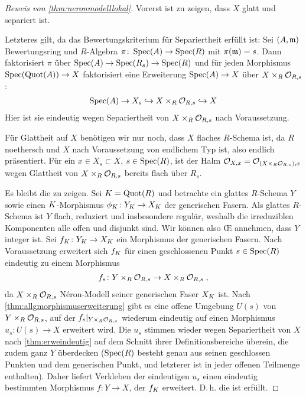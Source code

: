 \documentclass[german, bibliography=totoc]{scrreprt}
\begin{document}
\begin{proof}[Beweis von \ref{thm:neronmodelllokal}]
  Vorerst ist zu zeigen, dass $X$ glatt und separiert ist.

  Letzteres gilt, da das Bewertungskriterium für Separiertheit
  erfüllt ist: Sei $(A,\mathfrak{m})$ Bewertungsring und $R$-Algebra
  $\pi\colon\operatorname{Spec}(A)\to\operatorname{Spec}(R)$ mit $\pi(\mathfrak{m})=s$.
  Dann faktorisiert $\pi$ über
  $\operatorname{Spec}(A)\to\operatorname{Spec}(R_s)\to\operatorname{Spec}(R)$ und für jeden Morphismus
  $\operatorname{Spec}(\operatorname{Quot}(A))\to X$ faktorisiert eine Erweiterung
  $\operatorname{Spec}(A)\to X$ über $X\times_R\mathcal{O}_{R,s}$:
  \begin{gather*}
    \operatorname{Spec}(A)\to X_s\hookrightarrow X\times_R\mathcal{O}_{R,s}\hookrightarrow X
  \end{gather*}
  Hier ist sie eindeutig wegen
  Separiertheit von $X\times_R\mathcal{O}_{R,s}$ nach Voraussetzung.

  Für Glattheit auf $X$ benötigen wir nur noch, dass $X$ flaches
  $R$-Schema ist, da $R$ noethersch und $X$ nach Voraussetzung von
  endlichem Typ ist, also endlich präsentiert.
  Für ein $x\in X_s\subset X$, $s\in\operatorname{Spec}(R)$, ist der Halm
  $\mathcal{O}_{X,x}=\mathcal{O}_{(X\times_R\mathcal{O}_{R,s}),x}$ wegen Glattheit von
  $X\times_R\mathcal{O}_{R,s}$ bereits flach über $R_s$.

  Es bleibt die \NAbbEig zu zeigen.
  Sei $K=\operatorname{Quot}(R)$ und betrachte ein glattes $R$-Schema $Y$ sowie
  einen $K$-Morphismus $\phi_{K}\colon Y_{K}\to X_{K}$ der
  generischen Fasern.
  Als glattes $R$-Schema ist $Y$ flach, reduziert und insbesondere
  regulär, weshalb die irreduziblen Komponenten alle offen und
  disjunkt sind. Wir können also \OE{} annehmen, dass $Y$ integer ist.
  Sei $f_{K}\colon Y_{K}\to X_{K}$ ein Morphismus der generischen Fasern.
  Nach Voraussetzung erweitert sich $f_{K}$ für einen geschlossenen
  Punkt $s\in\operatorname{Spec}(R)$ eindeutig zu einem Morphismus
  \begin{gather*}
    f_s\colon Y\times_R\mathcal{O}_{R,s}\to X\times_R\mathcal{O}_{R,s}\;,
  \end{gather*}
  da $X\times_R\mathcal{O}_{R,s}$ Néron-Modell seiner generischen Faser $X_{K}$
  ist.
  Nach \ref{thm:allgmorphismuserweiterung} gibt es eine offene
  Umgebung $U(s)$ von $Y\times_R\mathcal{O}_{R,s}$, auf der
  $f_s|_{Y\times_R\mathcal{O}_{R,s}}$ wiederum
  eindeutig auf einen Morphismus $u_s\colon U(s)\to X$ erweitert
  wird.
  Die $u_s$ stimmen wieder wegen Separiertheit von $X$
  nach \ref{thm:erweindeutig} auf dem Schnitt ihrer
  Definitionsbereiche überein, die zudem ganz $Y$ überdecken
  ($\operatorname{Spec}(R)$ besteht genau aus seinen
  geschlossen Punkten und dem generischen Punkt, und letzterer ist
  in jeder offenen Teilmenge enthalten).
  Daher liefert Verkleben der eindeutigen $u_s$ einen
  eindeutig bestimmten Morphismus $f\colon Y\to X$, der
  $f_{K}$ erweitert.
  D.\,h. die \NAbbEig ist erfüllt.
\end{proof}
\end{document}
